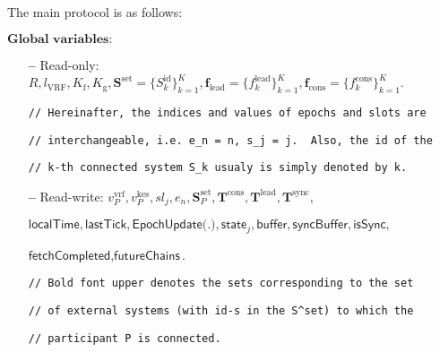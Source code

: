 The main protocol is as follows:\label{apndx:spectrum-protocol}
\begin{protocol}
    \caption{$\textsf{Spectrum}(P, \text{sid}; \mathcal{G}_{\text{Ledger}}, \mathcal{G}_{\text{ImpLClock}}, \mathcal{F}^{\Delta}_{\text{N-MC}})$}
    \begin{algorithmic}
        \State $\textbf{Global variables:}$
        \begin{itemize}
            \item[\textbf{--}] Read-only: $R, l_{\text{VRF}}, K_{\text{f}}, K_{\text{g}}, \mathbf{S}^{\text{set}} = \{S_k^{\text{id}}\}_{k=1}^K, \mathbf{f}_{\text{lead}} = \{f^{\text{lead}}_k\}_{k=1}^K, \mathbf{f}_{\text{cons}} = \{f^{\text{cons}}_k\}_{k=1}^K$.
            \item[] \lstinline|// Hereinafter, the indices and values of epochs and slots are|
            \item[] \lstinline|// interchangeable, i.e. e_n = n, s_j = j.  Also, the id of the|
            \item[]  \lstinline|// k-th connected system S_k usualy is simply denoted by k.|
            \item[\textbf{--}] Read-write: $v^{\text{vrf}}_P, v^{\text{kes}}_P, sl_j, e_n, \mathbf{S}_P^{\text{set}}, \mathbf{T}^{\text{cons}},  \mathbf{T}^{\text{lead}}, \mathbf{T}^{\text{sync}},$
            \item[] $\textsf{localTime}, \textsf{lastTick}, \textsf{EpochUpdate(.)}, \textsf{state}_{j}, \textsf{buffer}, \textsf{syncBuffer}, \textsf{isSync},$
            \item[] $\textsf{fetchCompleted}, \textsf{futureChains}$.
            \item[]  \lstinline|// Bold font upper denotes the sets corresponding to the set|
            \item[]  \lstinline|// of external systems (with id-s in the S^set) to which the|
            \item[]  \lstinline|// participant P is connected.|
        \end{itemize}


\end{algorithmic}
\end{protocol}
